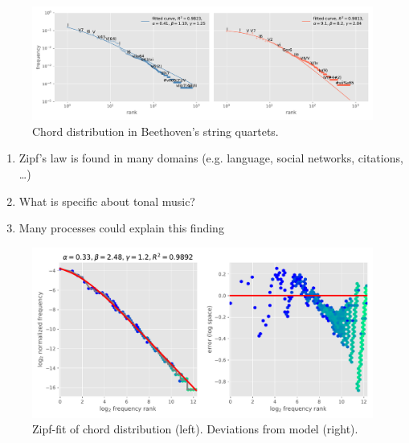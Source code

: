 \begin{frame}{\insertsectionhead}
  \begin{figure}
      \centering
      \includegraphics[width=\textwidth]{img/ABC_zipf_mandelbrot.pdf}
      \caption{Chord distribution in Beethoven's string quartets.}
  \end{figure}
\end{frame}

\begin{frame}{\insertsectionhead}
  \begin{enumerate}
    \item<1-> Zipf's law is found in many domains (e.g. language, social networks, citations, \ldots)
    \item<2-> What is specific about tonal music?
    \item<3-> Many processes could explain this finding~\citep{Piantadosi2014}
  \end{enumerate}
\end{frame}

\begin{frame}{\insertsectionhead}
  \begin{figure}
    \centering
    \includegraphics[width=.8\textwidth]{img/freqrank_disterror.pdf}
    \caption{Zipf-fit of chord distribution (left). Deviations from model (right).}
    \label{}
  \end{figure}
\end{frame}

